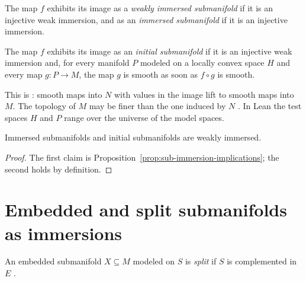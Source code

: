\begin{definition}
  \label{def:sub-immersed}
  \leanok
  The map $f$ exhibits its image as a \emph{weakly immersed submanifold} if it is an injective
  weak immersion, and as an \emph{immersed submanifold} if it is an injective immersion.
\end{definition}

\begin{definition}
  \label{def:initial-submanifold}
  \leanok
  The map $f$ exhibits its image as an \emph{initial submanifold} if it is an injective weak
  immersion and, for every manifold $P$ modeled on a locally convex space $H$ and every map
  $g \colon P \to M$, the map $g$ is smooth as soon as $f \circ g$ is smooth.
\end{definition}

This is \cite[Def.~3.3.22]{GN26}: smooth maps into $N$ with values in the image lift to smooth
maps into $M$. The topology of $M$ may be finer than the one induced by $N$
\cite[Rem.~3.3.23]{GN26}. In Lean the test spaces $H$ and $P$ range over the universe of the
model spaces.

\begin{proposition}
  \label{prop:sub-weakly-immersed}
  \leanok
  Immersed submanifolds and initial submanifolds are weakly immersed.
\end{proposition}

\begin{proof}
  \leanok
  The first claim is Proposition~\ref{prop:sub-immersion-implications}; the second holds by
  definition.
\end{proof}

\section{Embedded and split submanifolds as immersions}

\begin{definition}
  \label{def:split-submanifold}
  \leanok
  An embedded submanifold $X \subseteq M$ modeled on $S$ is \emph{split} if $S$ is
  complemented in $E$ \cite[Def.~3.1.10]{GN26}.
\end{definition}

